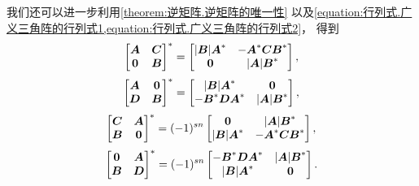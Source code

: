\begin{remark}
我们还可以进一步利用\cref{theorem:逆矩阵.逆矩阵的唯一性}
以及\cref{equation:行列式.广义三角阵的行列式1,equation:行列式.广义三角阵的行列式2}，
得到\begin{equation*}
	\begin{bmatrix}
		\boldsymbol{A} & \boldsymbol{C} \\
		\boldsymbol0 & \boldsymbol{B}
	\end{bmatrix}^*
	= \begin{bmatrix}
		\abs{\boldsymbol{B}} \boldsymbol{A}^* & -\boldsymbol{A}^*\boldsymbol{C}\boldsymbol{B}^* \\
		\boldsymbol0 & \abs{\boldsymbol{A}} \boldsymbol{B}^*
	\end{bmatrix},
\end{equation*}\begin{equation*}
	\begin{bmatrix}
		\boldsymbol{A} & \boldsymbol0 \\
		\boldsymbol{D} & \boldsymbol{B}
	\end{bmatrix}^*
	= \begin{bmatrix}
		\abs{\boldsymbol{B}} \boldsymbol{A}^* & \boldsymbol0 \\
		-\boldsymbol{B}^* \boldsymbol{D} \boldsymbol{A}^* & \abs{\boldsymbol{A}} \boldsymbol{B}^*
	\end{bmatrix},
\end{equation*}\begin{equation*}
	\begin{bmatrix}
		\boldsymbol{C} & \boldsymbol{A} \\
		\boldsymbol{B} & \boldsymbol0
	\end{bmatrix}^*
	= (-1)^{sn} \begin{bmatrix}
		\boldsymbol0 & \abs{\boldsymbol{A}} \boldsymbol{B}^* \\
		\abs{\boldsymbol{B}} \boldsymbol{A}^* & -\boldsymbol{A}^*\boldsymbol{C}\boldsymbol{B}^*
	\end{bmatrix},
\end{equation*}\begin{equation*}
	\begin{bmatrix}
		\boldsymbol0 & \boldsymbol{A} \\
		\boldsymbol{B} & \boldsymbol{D}
	\end{bmatrix}^*
	= (-1)^{sn} \begin{bmatrix}
		-\boldsymbol{B}^*\boldsymbol{D}\boldsymbol{A}^* & \abs{\boldsymbol{A}} \boldsymbol{B}^* \\
		\abs{\boldsymbol{B}} \boldsymbol{A}^* & \boldsymbol0
	\end{bmatrix}.
\end{equation*}
\end{remark}

